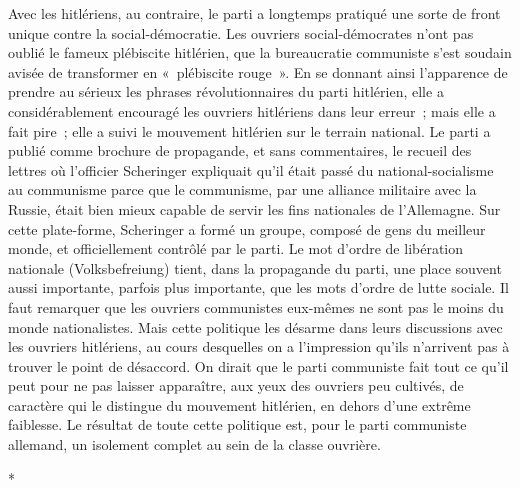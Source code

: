 \documentclass[french,twoside]{book} %
\begin{document}
Avec les hitlériens, au contraire, le parti a longtemps pratiqué une sorte de front unique contre la social-démocratie. Les ouvriers social-démocrates n'ont pas oublié le fameux plébiscite hitlérien, que la bureaucratie communiste s'est soudain avisée de transformer en « plébiscite rouge ». En se donnant ainsi l'apparence de prendre au sérieux les phrases révolutionnaires du parti hitlé­rien, elle a considérablement encouragé les ouvriers hitlériens dans leur erreur ; mais elle a fait pire ; elle a suivi le mouvement hitlérien sur le terrain national. Le parti a publié comme brochure de propagande, et sans commen­taires, le recueil des lettres où l'officier Scheringer expliquait qu'il était passé du national-socialisme au communisme parce que le communisme, par une alliance militaire avec la Russie, était bien mieux capable de servir les fins nationales de l'Allemagne. Sur cette plate-forme, Scheringer a formé un grou­pe, composé de gens du meilleur monde, et officiellement contrôlé par le parti. Le mot d'ordre de libération nationale (Volksbefreiung) tient, dans la propagande du parti, une place souvent aussi importante, parfois plus impor­tante, que les mots d'ordre de lutte sociale. Il faut remarquer que les ouvriers communistes eux-mêmes ne sont pas le moins du monde nationalistes. Mais cette politique les désarme dans leurs discussions avec les ouvriers hitlériens, au cours desquelles on a l'impression qu'ils n'arrivent pas à trouver le point de désaccord. On dirait que le parti communiste fait tout ce qu'il peut pour ne pas laisser apparaître, aux yeux des ouvriers peu cultivés, de caractère qui le distingue du mouvement hitlérien, en dehors d'une extrême faiblesse. Le résultat de toute cette politique est, pour le parti communiste allemand, un isolement complet au sein de la classe ouvrière.\par

\begin{center}
\noindent \centerline{*}\par
\end{center}
\end{document}
